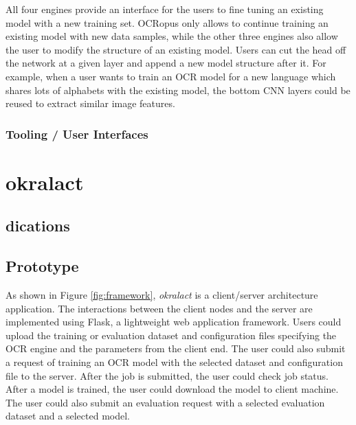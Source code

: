 \documentclass[conference]{IEEEtran}
\begin{document}
All four engines provide an interface for the users to fine tuning an existing
model with a new training set. OCRopus only allows to continue training an
existing model with new data samples, while the other three engines also allow
the user to modify the structure of an existing model. Users can cut the head
off the network at a given layer and append a new model structure after it. For
example, when a user wants to train an OCR model for a new language which
shares lots of alphabets with the existing model, the bottom CNN layers could
be reused to extract similar image features.

\subsubsection*{Tooling / User Interfaces}


\section*{okralact}

\subsection*{dications}


\subsection*{Prototype}     

As shown in Figure \ref{fig:framework}, \textit{okralact} is a client/server
architecture application. The interactions between the client nodes and the
server are implemented using Flask, a lightweight web application framework.
Users could upload the training or evaluation dataset and configuration files
specifying the OCR engine and the parameters    from the client end. The user
could also submit a request of training an OCR    model with the selected
dataset and configuration file to the server. After the job is submitted, the
user could check job status. After a model is trained,    the user could
download the model to client machine. The user could also submit an evaluation
request with a selected evaluation dataset and a selected model.
\end{document}
